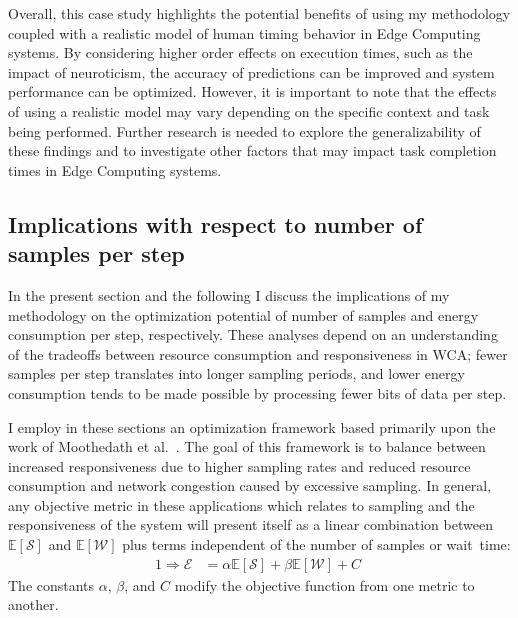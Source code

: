 Overall, this case study highlights the potential benefits of using my methodology coupled with a realistic model of human timing behavior in Edge Computing systems.
By considering higher order effects on execution times, such as the impact of neuroticism, the accuracy of predictions can be improved and system performance can be optimized.
However, it is important to note that the effects of using a realistic model may vary depending on the specific context and task being performed.
Further research is needed to explore the generalizability of these findings and to investigate other factors that may impact task completion times in Edge Computing systems.

\subsection{Implications with respect to number of samples per step}

In the present section and the following I discuss the implications of my methodology on the optimization potential of number of samples and energy consumption per step, respectively.
These analyses depend on an understanding of the tradeoffs between resource consumption and responsiveness in \gls{WCA};
fewer samples per step translates into longer sampling periods, and lower energy consumption tends to be made possible by processing fewer bits of data per step.

I employ in these sections an optimization framework based primarily upon the work of Moothedath et al.~\cite{moothedath2021energy,moothedath2022energy1,moothedath2022energy2}.
The goal of this framework is to balance between increased responsiveness due to higher sampling rates and reduced resource consumption and network congestion caused by excessive sampling.
In general, any objective metric in these applications which relates to sampling and the responsiveness of the system will present itself
as a linear combination between \ensuremath{\mathbb{E}[\mathcal{S}]} and \ensuremath{\mathbb{E}[\mathcal{W}]} plus terms independent of the number of samples or wait~time:
\begin{alignat}{1}\label{eq:tradeoff}
    \Rightarrow\mathcal{E}&=\alpha\mathbb{E}[\mathcal{S}]+\beta\mathbb{E}[\mathcal{W}]+C\;
\end{alignat}
The constants \ensuremath{\alpha}, \ensuremath{\beta}, and \ensuremath{C} modify the objective function from one metric to another.

